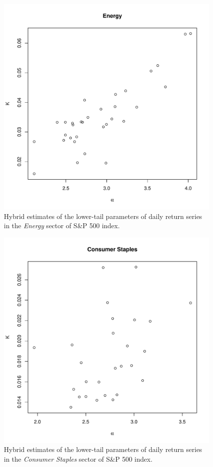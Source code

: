 \documentclass{article}
\newcommand{\1}[1]{
  \mathbf{1}_{\{#1\}}
}
\begin{document}
\begin{figure}[htb!]
  \centering
  \includegraphics[width=\textwidth]{Energy_alpha_K.pdf}
  \caption{Hybrid estimates of the lower-tail parameters of daily
    return series in the {\it Energy} sector of S\&P
    500 index.
  }
  \label{fig:Energy_alpha_K}
\end{figure}

\begin{figure}[htb!]
  \centering
  \includegraphics[width=\textwidth]{Consumer_Staples_alpha_K.pdf}
  \caption{Hybrid estimates of the lower-tail parameters of daily
    return series in the {\it Consumer Staples} sector of S\&P
    500 index.
  }
  \label{fig:Consumer_Staples_alpha_K}
\end{figure}
\end{document}
